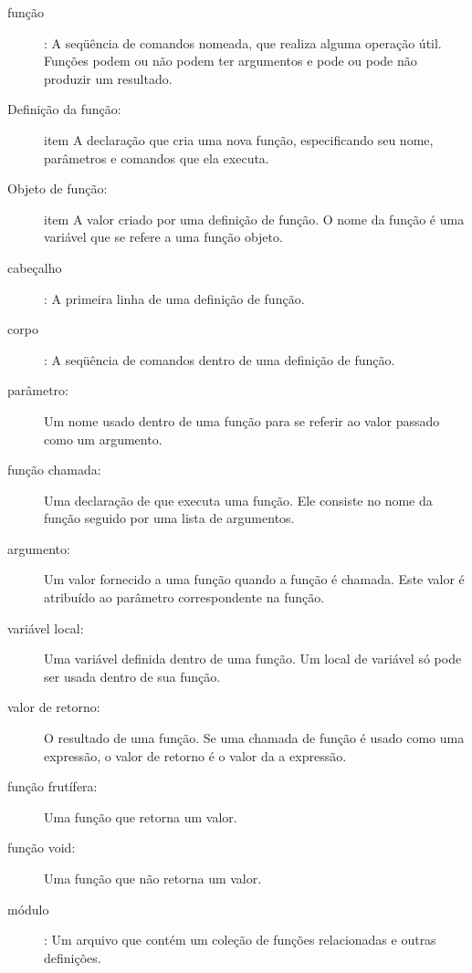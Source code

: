 \documentclass[10pt]{book}
\begin{document}
\begin{exercise}
\begin{description}
\item[função]: A seqüência de comandos nomeada, que realiza alguma
operação útil. Funções podem ou não podem ter argumentos e pode ou
pode não produzir um resultado.

\item[Definição da função:] item A declaração que cria uma nova função,
especificando seu nome, parâmetros e comandos que ela executa.

\item[Objeto de função:] item A valor criado por uma definição de função.
O nome da função é uma variável que se refere a uma função
objeto.

\item[cabeçalho]: A primeira linha de uma definição de função.

\item[corpo]: A seqüência de comandos dentro de uma definição de função.

\item[parâmetro:] Um nome usado dentro de uma função para se referir ao valor
passado como um argumento.

\item[função chamada:] Uma declaração de que executa uma função. Ele
consiste no nome da função seguido por uma lista de argumentos.

\item[argumento:] Um valor fornecido a uma função quando a função é chamada.
Este valor é atribuído ao parâmetro correspondente na função.

\item[variável local:] Uma variável definida dentro de uma função. Um local de
variável só pode ser usada dentro de sua função.

\item[valor de retorno:] O resultado de uma função. Se uma chamada de função
é usado como uma expressão, o valor de retorno é o valor da
a expressão.

\item[função frutífera:] Uma função que retorna um valor.

\item[função void:] Uma função que não retorna um valor.

\item[módulo]: Um arquivo que contém um
coleção de funções relacionadas e outras definições.


\end{description}
\end{exercise}
\end{document}
